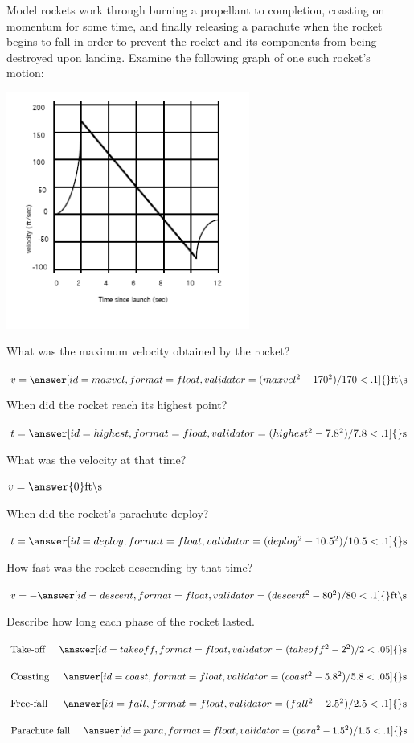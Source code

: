 \documentclass{ximera}
\begin{document}
\begin{question}
Model rockets work through burning a propellant to completion, coasting on momentum for some time, and finally releasing a parachute when the rocket begins to fall in order to prevent the rocket and its components from being destroyed upon landing. Examine the following graph of one such rocket's motion:
\begin{image}
    \includegraphics[width=80mm]{rocket.png}
\end{image}

What was the maximum velocity obtained by the rocket?

$v = \answer[id=maxvel,format=float,validator=(maxvel^2-170^2)/170 < .1]{} \text{ft}\backslash \text{s}$

When did the rocket reach its highest point?

$t = \answer[id=highest,format=float,validator=(highest^2-7.8^2)/7.8 < .1]{} \text{s}$

What was the velocity at that time?

$v = \answer{0} \text{ft} \backslash \text{s}$

When did the rocket's parachute deploy?

$t = \answer[id=deploy,format=float,validator=(deploy^2-10.5^2)/10.5 < .1]{} \text{s}$

How fast was the rocket descending by that time?

$v = -\answer[id=descent,format=float,validator=(descent^2-80^2)/80 < .1]{} \text{ft} \backslash \text{s}$

Describe how long each phase of the rocket lasted.

$\text{Take-off} \hspace{5mm} \answer[id=takeoff,format=float,validator=(takeoff^2-2^2)/2 < .05]{} \text{s}$

$\text{Coasting} \hspace{5mm} \answer[id=coast,format=float,validator=(coast^2-5.8^2)/5.8 < .05]{} \text{s}$

$\text{Free-fall} \hspace{5mm} \answer[id=fall,format=float,validator=(fall^2-2.5^2)/2.5 < .1]{} \text{s}$

$\text{Parachute fall} \hspace{5mm} \answer[id=para,format=float,validator=(para^2-1.5^2)/1.5 < .1]{} \text{s}$
\end{question}
\end{document}
